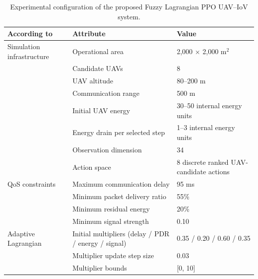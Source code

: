 \begin{table}[!t]
\caption{Experimental configuration of the proposed Fuzzy Lagrangian PPO UAV--IoV system.}
\label{tab:experimental_configuration}
\centering
\small
\begin{tabular}{@{}lll@{}}
\toprule
According to & Attribute & Value \\
\midrule
Simulation infrastructure & Operational area & 2,000 $\times$ 2,000 m$^2$ \\
& Candidate UAVs & 8 \\
& UAV altitude & 80--200 m \\
& Communication range & 500 m \\
& Initial UAV energy & 30--50 internal energy units \\
& Energy drain per selected step & 1--3 internal energy units \\
& Observation dimension & 34 \\
& Action space & 8 discrete ranked UAV-candidate actions \\
QoS constraints & Maximum communication delay & 95 ms \\
& Minimum packet delivery ratio & 55\% \\
& Minimum residual energy & 20\% \\
& Minimum signal strength & 0.10 \\
Adaptive Lagrangian & Initial multipliers (delay / PDR / energy / signal) & 0.35 / 0.20 / 0.60 / 0.35 \\
& Multiplier update step size & 0.03 \\
& Multiplier bounds & [0, 10] \\
\bottomrule
\end{tabular}
\end{table}
